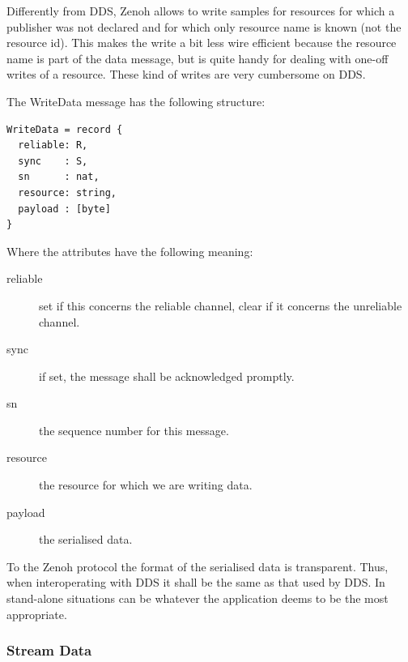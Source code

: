 \documentclass[a4paper,oneside,article]{memoir}
\begin{document}
Differently from DDS, Zenoh allows to write samples for resources for which a publisher was not
declared and for which only resource name is known (not the resource id).  This makes the write a
bit less wire efficient because the resource name is part of the data message, but is quite handy
for dealing with one-off writes of a resource.  These kind of writes are very cumbersome on DDS\@.

The WriteData message has the following structure:
\begin{verbatim}
WriteData = record {
  reliable: R,
  sync    : S,
  sn      : nat,
  resource: string,
  payload : [byte]
}
\end{verbatim}
Where the attributes have the following meaning:
\begin{description}
\item[reliable] set if this concerns the reliable channel, clear if it concerns the unreliable
  channel.
\item[sync] if set, the message shall be acknowledged promptly.
\item[sn] the sequence number for this message.
\item[resource] the resource for which we are writing data.
\item[payload] the serialised data.
\end{description}
To the Zenoh protocol the format of the serialised data is transparent.  Thus, when
interoperating with DDS it shall be the same as that used by DDS\@.  In stand-alone situations can
be whatever the application deems to be the most appropriate.

\subsubsection{Stream Data}
\end{document}
